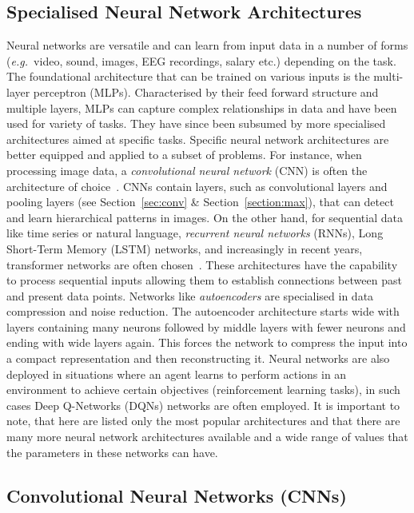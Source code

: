 \subsection{Specialised Neural Network Architectures}
Neural networks are versatile and can learn from input data in a number of forms (\textit{e.g.\ }video, sound, images, EEG recordings, salary etc.) depending on the task. The foundational architecture that can be trained on various inputs is the multi-layer perceptron (MLPs). Characterised by their feed forward structure and multiple layers, MLPs can capture complex relationships in data and have been used for variety of tasks. They have since been subsumed by more specialised architectures aimed at specific tasks. Specific neural network architectures are better equipped and applied to a subset of problems. For instance, when processing image data, a \textit{convolutional neural network} (CNN) is often the architecture of choice~\cite{egmont2002image}. CNNs contain layers, such as convolutional layers and pooling layers (see Section~\ref{sec:conv} \& Section~\ref{section:max}), that can detect and learn hierarchical patterns in images. On the other hand, for sequential data like time series or natural language, \textit{recurrent neural networks} (RNNs), Long Short-Term Memory (LSTM) networks, and increasingly in recent years, transformer networks are often chosen~\cite{husken2003recurrent, langkvist2014review, zhou2021informer}. These architectures have the capability to process sequential inputs allowing them to establish connections between past and present data points. Networks like \textit{autoencoders} are specialised in data compression and noise reduction. The autoencoder architecture starts wide with layers containing many neurons followed by middle layers with fewer neurons and ending with wide layers again. This forces the network to compress the input into a compact representation and then reconstructing it. Neural networks are also deployed in situations where an agent learns to perform actions in an environment to achieve certain objectives (\ie reinforcement learning tasks), in such cases Deep Q-Networks (DQNs) networks  are often employed. It is important to note, that here are listed only the most popular architectures and that there are many more neural network architectures available and a wide range of values that the parameters in these networks can have.


\subsection{Convolutional Neural Networks (CNNs)}


